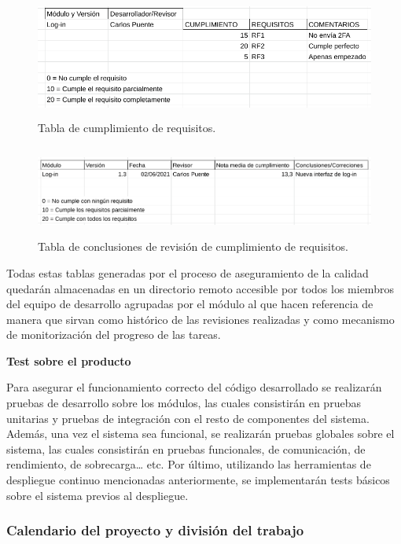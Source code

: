 \documentclass{article}
\begin{document}
\begin{figure}[H]
    \centering
        \includegraphics[height=4cm]{../images/tabla_cumplimiento_requisitos.png}
    \caption{Tabla de cumplimiento de requisitos.}
    \label{tablaRequisitos}
\end{figure}

\begin{figure}[H]
    \centering
        \includegraphics[height=3cm]{../images/tabla_conclusiones_revision_requisitos.png}
    \caption{Tabla de conclusiones de revisión de cumplimiento de requisitos.}
    \label{tablaConclusionesRequisitos}
\end{figure}

Todas estas tablas generadas por el proceso de aseguramiento de la calidad quedarán almacenadas en un directorio 
remoto accesible por todos los miembros del equipo de desarrollo agrupadas por el módulo al que hacen referencia 
de manera que sirvan como histórico de las revisiones realizadas y como mecanismo de monitorización del progreso
de las tareas.

\textbf{Test sobre el producto}

Para asegurar el funcionamiento correcto del código desarrollado se realizarán pruebas de desarrollo sobre los módulos, 
las cuales consistirán en pruebas unitarias y pruebas de integración con el resto de componentes del sistema. 
Además, una vez el sistema sea funcional, se realizarán pruebas globales sobre el sistema, las cuales consistirán en 
pruebas funcionales, de comunicación, de rendimiento, de sobrecarga… etc. 
Por último, utilizando las herramientas de despliegue continuo mencionadas anteriormente, se implementarán tests básicos 
sobre el sistema previos al despliegue.

\subsubsection{Calendario del proyecto y división del trabajo}
\end{document}
